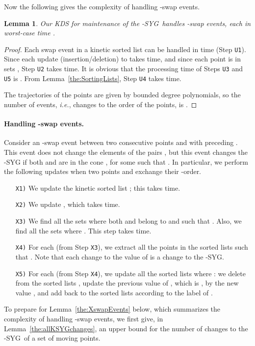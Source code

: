 \documentclass[preprint,12pt]{elsarticle}
\def\ksyg{\mbox{-SYG}}
\newcommand{\ie}{\emph{i.e.}}
\newtheorem{lemma}{Lemma}[section]
\begin{document}
Now the following gives the complexity of handling -swap events.


\begin{lemma}\label{the:UswapEvents}
Our KDS for maintenance of the \ksyg~handles  -swap events, each in worst-case time .
\end{lemma}
\begin{proof}
Each swap event in a kinetic sorted list can be handled in  time (Step \texttt{U1}). Since each update (insertion/deletion) to  takes  time, and since each point is in  sets , Step \texttt{U2} takes  time. It is obvious that the processing time of Steps \texttt{U3} and \texttt{U5} is . From Lemma~\ref{the:SortingLists}, Step \texttt{U4} takes  time.

The trajectories of the points are given by  bounded degree polynomials, so the number of events, \ie, changes to the order of the points, is .
\end{proof}

\paragraph{Handling -swap events.}
Consider an -swap event between two consecutive points  and  with  preceding . This event does not change the elements of the pairs , but this event changes the -SYG if both  and  are in the cone , for some  such that . In particular, we perform the following updates when two points  and  exchange their -order.
\begin{enumerate}
\item[\texttt{X1)}] We update the kinetic sorted list ; this takes  time.
\item[\texttt{X2)}] We update , which takes  time.
\item[\texttt{X3)}] We find all the sets  where both  and  belong to  and such that . Also, we find all the sets  where . This step takes  time.
\item[\texttt{X4)}] For each  (from Step \texttt{X3}), we extract all the points  in the sorted lists  such that . Note that each change to the value of  is a change to the \ksyg.
\item[\texttt{X5)}] For each  (from Step \texttt{X4}), we update all the sorted lists  where : we delete  from the sorted lists , update the previous value of , which is , by the new value , and add  back to the sorted lists  according to the label of .
\end{enumerate}


To prepare for Lemma~\ref{the:XswapEvents} below, which summarizes the complexity of handling -swap events, we first give, in Lemma~\ref{the:allKSYGchanges}, an upper bound for the number of changes to the \ksyg~of a set of moving points.
\end{document}
